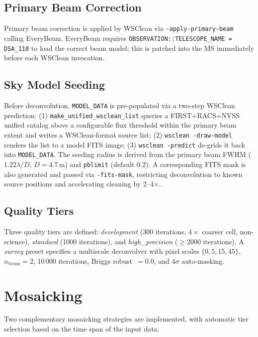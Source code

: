 \documentclass[12pt,a4paper]{article}
\begin{document}
\subsection{Primary Beam Correction}

Primary beam correction is applied by WSClean via
\texttt{-apply-primary-beam} calling EveryBeam.  EveryBeam requires
\texttt{OBSERVATION::TELESCOPE\_NAME = DSA\_110} to load the correct beam
model; this is patched into the MS immediately before each WSClean
invocation.

\subsection{Sky Model Seeding}

Before deconvolution, \texttt{MODEL\_DATA} is pre-populated via a two-step
WSClean prediction: (1) \texttt{make\_unified\_wsclean\_list} queries a
FIRST+RACS+NVSS unified catalog above a configurable flux threshold within
the primary beam extent and writes a WSClean-format source list; (2)
\texttt{wsclean -draw-model} renders the list to a model FITS image; (3)
\texttt{wsclean -predict} de-grids it back into \texttt{MODEL\_DATA}.
The seeding radius is derived from the primary beam FWHM
($1.22\lambda/D$, $D=4.7$\,m) and \texttt{pblimit} (default 0.2).
A corresponding FITS mask is also generated and passed via
\texttt{-fits-mask}, restricting deconvolution to known source positions
and accelerating cleaning by 2--4$\times$.

\subsection{Quality Tiers}

Three quality tiers are defined: \textit{development} (300 iterations,
$4\times$ coarser cell, non-science), \textit{standard} (1000 iterations),
and \textit{high\_precision} ($\geq$2000 iterations).  A \textit{survey}
preset specifies a multiscale deconvolver with pixel scales $\{0,5,15,45\}$,
$n_\text{terms}=2$, 10\,000 iterations, Briggs robust~$=0.0$, and $4\sigma$
auto-masking.

\section{Mosaicking}

Two complementary mosaicking strategies are implemented, with automatic
tier selection based on the time span of the input data.
\end{document}
